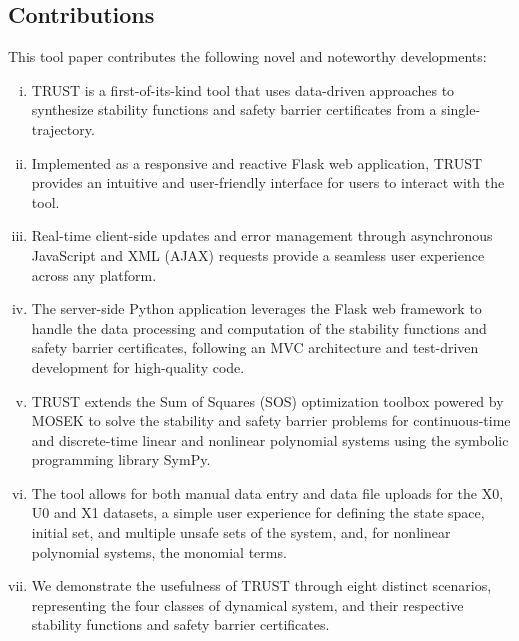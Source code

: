 \documentclass[sigconf]{acmart}
\begin{document}
\subsection{Contributions}\label{subsec:contributions}
This tool paper contributes the following novel and noteworthy developments:
\begin{enumerate}[i.]
\item TRUST is a first-of-its-kind tool that uses data-driven approaches to synthesize stability functions and safety barrier certificates from a single-trajectory.
\item Implemented as a responsive and reactive Flask web application, TRUST provides an intuitive and user-friendly interface for users to interact with the tool.
\item Real-time client-side updates and error management through asynchronous JavaScript and XML (AJAX) requests provide a seamless user experience across any platform.
\item The server-side Python application leverages the Flask web framework to handle the data processing and computation of the stability functions and safety barrier certificates, following an MVC architecture and test-driven development for high-quality code.
\item TRUST extends the Sum of Squares (SOS) optimization toolbox powered by MOSEK to solve the stability and safety barrier problems for continuous-time and discrete-time linear and nonlinear polynomial systems using the symbolic programming library SymPy.
\item The tool allows for both manual data entry and data file uploads for the X0, U0 and X1 datasets, a simple user experience for defining the state space, initial set, and multiple unsafe sets of the system, and, for nonlinear polynomial systems, the monomial terms.
\item We demonstrate the usefulness of TRUST through eight distinct scenarios, representing the four classes of dynamical system, and their respective stability functions and safety barrier certificates.
\end{enumerate}
\end{document}
